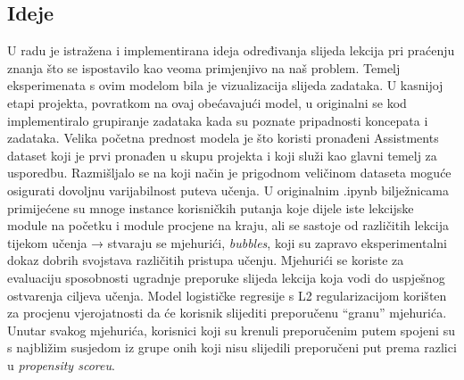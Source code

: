 \documentclass[times, utf8,projekt]{fer}
\begin{document}
\subsection{Ideje}
U radu je istražena i implementirana ideja određivanja slijeda lekcija pri praćenju znanja što se ispostavilo kao veoma primjenjivo na naš problem. Temelj eksperimenata s ovim modelom bila je vizualizacija slijeda zadataka. U kasnijoj etapi projekta, povratkom na ovaj obećavajući model, u originalni se kod implementiralo grupiranje zadataka kada su poznate pripadnosti koncepata i zadataka. Velika početna prednost modela je što koristi pronađeni Assistments dataset koji je prvi pronađen u skupu projekta i koji služi kao glavni temelj za usporedbu. Razmišljalo se na koji način je prigodnom veličinom dataseta moguće osigurati dovoljnu varijabilnost puteva učenja. \newline
U originalnim .ipynb bilježnicama primijećene su mnoge instance korisničkih putanja koje dijele iste lekcijske module na početku i module procjene na kraju, ali se sastoje od različitih lekcija tijekom učenja → stvaraju se mjehurići, \textit{bubbles}, koji su zapravo eksperimentalni dokaz dobrih svojstava različitih pristupa učenju. Mjehurići se koriste za evaluaciju sposobnosti ugradnje preporuke slijeda lekcija koja vodi do uspješnog ostvarenja ciljeva učenja. Model logističke regresije s L2 regularizacijom korišten za procjenu vjerojatnosti da će korisnik slijediti preporučenu “granu” mjehurića. Unutar svakog mjehurića, korisnici koji su krenuli preporučenim putem spojeni su s najbližim susjedom iz grupe onih koji nisu slijedili preporučeni put prema razlici u \textit{propensity scoreu}.
\end{document}
